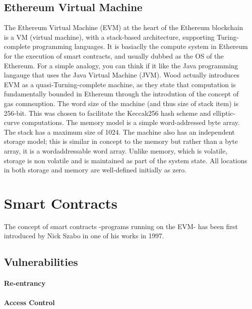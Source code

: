     \subsection{Ethereum Virtual Machine}
        
        The Ethereum Virtual Machine (EVM) at the heart of the Ethereum blockchain is a VM (virtual machine), with a stack-based architecture, supporting Turing-complete programming languages.
        It is basiaclly the compute system in Ethereum for the execution of smart contracts, and usually dubbed as the OS of the Ethereum.
        For a simple analogy, you can think if it like the Java programming langauge that uses the Java Virtual Machine (JVM).
        Wood actually introduces EVM as a quasi-Turning-complete machine, as they state that computation is fundamentally bounded in Ethereum through the introdution of the concept of gas comnsuption.
        The word size of the machine (and thus size of stack item) is 256-bit.
        This was chosen to facilitate the Keccak256 hash scheme and elliptic-curve computations.
        The memory model is a simple word-addressed byte array.
        The stack has a maximum size of 1024.
        The machine also has an independent storage model;
        this is similar in concept to the memory but rather than a byte array, it is a wordaddressable word array.
        Unlike memory, which is volatile, storage is non volatile and is maintained as part of the system state.
        All locations in both storage and memory are well-defined initially as zero.


\section{Smart Contracts}
    The concept of smart contracts -programs running on the EVM- has been first introduced by Nick Szabo in one of his works in 1997.~\cite{szabo1997formalizing}

    \subsection{Vulnerabilities}
        

            \paragraph{Re-entrancy}
                

            \paragraph{Access Control}
                


